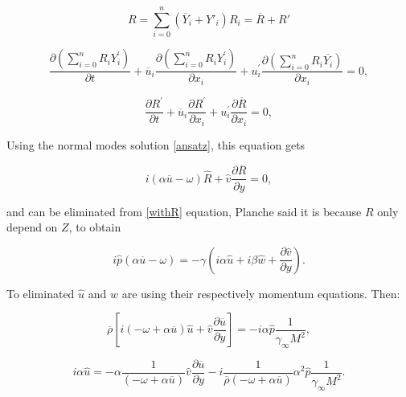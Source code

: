 \begin{equation*} 
R=\sum_{i=0}^n (\overline{Y}_i+Y'_i) R_i=\overline{R}+R'
\end{equation*} 

\begin{equation*} 
\frac{\partial (\sum_{i=0}^n R_i Y_i^{\prime})}{\partial t}
+                                    
\overline{u}_i                       
\frac{\partial (\sum_{i=0}^n R_i Y_i^{\prime})}{\partial x_i}
+
u_i^{\prime} 
\frac{\partial (\sum_{i=0}^n R_i \overline{ Y_i})}{\partial x_i}
=
0
,
\end{equation*} 

\begin{equation*} 
\frac{\partial R^{\prime}}{\partial t}
+                                    
\overline{u}_i                       
\frac{\partial R^{\prime}}{\partial x_i}
+
u_i^{\prime} 
\frac{\partial \overline{R}}{\partial x_i}
=
0
,
\end{equation*} 

Using the normal modes solution \ref{ansatz}, this equation gets  

\begin{equation} 
i(
\alpha
\overline{u}
-
\omega 
)
\hat{R}
+
\hat{v}
\frac{\partial \overline{R}}{\partial y}
=
0
,
\label{rhat}
\end{equation} 

and can be eliminated from \ref{withR} equation,
{\color{red}Planche said it is because $R$ only depend on $Z$},  
to obtain


\begin{equation*} 
    i
    \hat{p}
    (
    \alpha
    \overline{u}
    -
    \omega 
    )
=
-
\gamma
\left(
i
\alpha
\hat{u}
+
i
\beta
\hat{w}
+
\frac{\partial \hat{v}}{\partial y}
\right)
.
\label{beforeuw}
\end{equation*} 

To eliminated $\hat{u}$ and $\hat{w}$ are using 
their respectively momentum equations. Then: 

\begin{equation*} 
\overline{\rho}
\left[
i
\left(
    -
\omega 
+
\alpha 
\overline{u}
\right)
\hat{u}
+
\hat{v}
\frac{\partial\overline{u}}{\partial y}
\right]
=
-
i
\alpha\hat{p}
\frac{1}{\gamma_{\infty} M^{2}}
,
\end{equation*} 

%
\begin{equation*} 
    i
    \alpha
\hat{u}
=
-
\alpha
\frac{1}{
\left(
    -
\omega 
+
\alpha 
\overline{u}
\right)
}
\hat{v}
\frac{\partial\overline{u}}{\partial y}
-
i
\frac{1}{
\overline{\rho}
\left(
-
\omega 
+
\alpha 
\overline{u}
\right)
}
\alpha^2\hat{p}
\frac{1}{\gamma_{\infty} M^{2}}
.
\end{equation*} 


